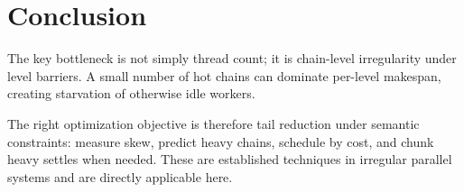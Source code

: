 \section{Conclusion}
The key bottleneck is not simply thread count; it is chain-level irregularity under level barriers.
A small number of hot chains can dominate per-level makespan, creating starvation of otherwise idle workers.

The right optimization objective is therefore tail reduction under semantic constraints:
measure skew, predict heavy chains, schedule by cost, and chunk heavy settles when needed.
These are established techniques in irregular parallel systems and are directly applicable here.
